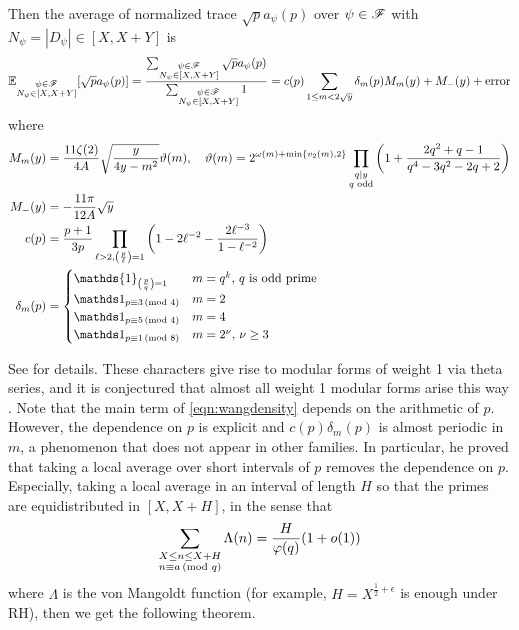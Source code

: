 \begin{theorem}
    \label{thm:wang}
    Then the average of normalized trace $\sqrt{p} a_\psi(p)$ over $\psi \in \mathscr{F}$ with $N_\psi = |D_\psi| \in [X, X + Y]$ is
    \begin{equation}
        \label{eqn:wangdensity}
        \mathbb{E}_{\substack{\psi \in \mathscr{F} \\ N_\psi \in [X, X + Y]}}[\sqrt{p} a_\psi(p)] = \frac{\sum_{\substack{\psi \in \mathscr{F} \\ N_\psi \in [X, X + Y]}} \sqrt{p} a_\psi(p)}{\sum_{\substack{\psi \in \mathscr{F} \\ N_\psi \in [X, X + Y]}} 1} = c(p) \sum_{1 \le m < 2 \sqrt{y}} \delta_m(p) M_m(y) + M_-(y) + \text{error}
    \end{equation}
    where
    \begin{align*}
        M_m(y) &= \frac{11\zeta(2)}{4A} \sqrt{\frac{y}{4y - m^2}} \vartheta(m), \quad \vartheta(m) = 2^{\omega(m) + \min\{v_2(m), 2\}} \prod_{\substack{q \mid y \\ q \text{ odd}}} \left(1 + \frac{2 q^2 + q - 1}{q^4 - 3q^2 - 2q + 2}\right)\\
        M_-(y) &= -\frac{11\pi}{12 A} \sqrt{y}\\
        c(p) &= \frac{p+1}{3p} \prod_{\ell > 2, \left(\frac{p}{\ell}\right) = 1} \left(1 - 2 \ell^{-2} - \frac{2 \ell^{-3}}{1 - \ell^{-2}}\right) \\
        \delta_m(p) &= \begin{cases}
            \mathds{1}_{\left(\frac{p}{q}\right) = 1} & m = q^k, \,q\text{ is odd prime} \\
            \1_{p \equiv 3 \Mod{4}} & m = 2 \\
            \1_{p \equiv 5 \Mod{4}} & m = 4 \\
            \1_{p \equiv 1 \Mod{8}} & m = 2^\nu, \,\nu \ge 3
        \end{cases}
    \end{align*}
\end{theorem}
See \cite[Theorem 1]{wang2025murmurations} for details.
These characters give rise to modular forms of weight 1 via theta series, and it is conjectured that almost all weight 1 modular forms arise this way \cite{frohlich1977algebraic}.
Note that the main term of \eqref{eqn:wangdensity} depends on the arithmetic of $p$.
However, the dependence on $p$ is explicit and $c(p) \delta_m(p)$ is almost periodic in $m$, a phenomenon that does not appear in other families.
In particular, he proved that taking a local average over short intervals of $p$ removes the dependence on $p$.
Especially, taking a local average in an interval of length $H$ so that the primes are equidistributed in $[X, X + H]$, in the sense that
\[
\sum_{\substack{X \le n \le X + H \\ n \equiv a \,(\text{mod }q)}} \Lambda(n) = \frac{H}{\varphi(q)} (1 + o(1))
\]
where $\Lambda$ is the von Mangoldt function (for example, $H = X^{\frac{1}{2} + \epsilon}$ is enough under RH), then we get the following theorem.

